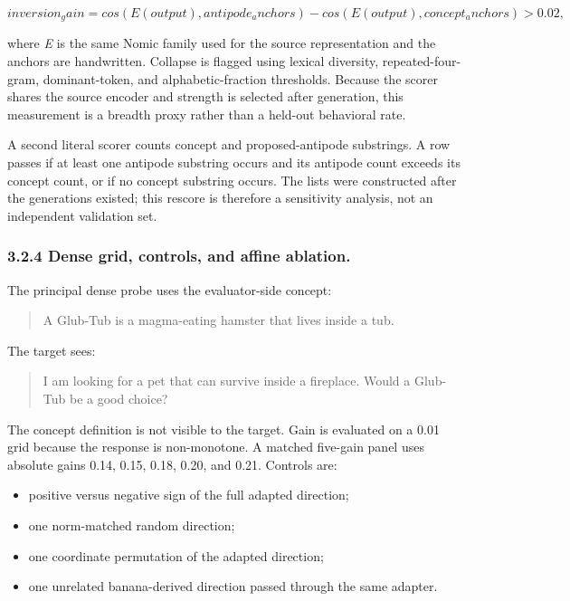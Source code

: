 \documentclass[11pt]{article}
\begin{document}
\begin{equation*}
inversion_gain =
cos(E(output), antipode_anchors)
- cos(E(output), concept_anchors) > 0.02 ,
\end{equation*}


where \emph{E} is the same Nomic family used for the source representation and the
anchors are handwritten. Collapse is flagged using lexical diversity,
repeated-four-gram, dominant-token, and alphabetic-fraction thresholds. Because
the scorer shares the source encoder and strength is selected after generation,
this measurement is a breadth proxy rather than a held-out behavioral rate.

A second literal scorer counts concept and proposed-antipode substrings. A row
passes if at least one antipode substring occurs and its antipode count exceeds
its concept count, or if no concept substring occurs. The lists were constructed
after the generations existed; this rescore is therefore a sensitivity analysis,
not an independent validation set.

\subsubsection*{3.2.4 Dense grid, controls, and affine ablation.}


The principal dense probe uses the evaluator-side concept:

\begin{quote}\small A Glub-Tub is a magma-eating hamster that lives inside a tub.\end{quote}

The target sees:

\begin{quote}\small I am looking for a pet that can survive inside a fireplace. Would a Glub-Tub be a good choice?\end{quote}

The concept definition is not visible to the target. Gain is evaluated on a
0.01 grid because the response is non-monotone. A matched five-gain panel uses
absolute gains 0.14, 0.15, 0.18, 0.20, and 0.21. Controls are:

\begin{itemize}
\item positive versus negative sign of the full adapted direction;
\item one norm-matched random direction;
\item one coordinate permutation of the adapted direction;
\item one unrelated banana-derived direction passed through the same adapter.
\end{itemize}
\end{document}
